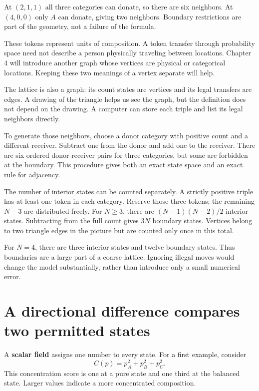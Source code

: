\documentclass[11pt,oneside,openany]{book}
\theoremstyle{definition}
\theoremstyle{remark}
\numberwithin{equation}{chapter}
\begin{document}
At \((2,1,1)\) all three categories can donate, so there are six neighbors. At \((4,0,0)\) only \(A\) can donate, giving two neighbors. Boundary restrictions are part of the geometry, not a failure of the formula.

These tokens represent units of composition. A token transfer through probability space need not describe a person physically traveling between locations. Chapter 4 will introduce another graph whose vertices are physical or categorical locations. Keeping these two meanings of a vertex separate will help.

The lattice is also a graph: its count states are vertices and its legal transfers are edges. A drawing of the triangle helps us see the graph, but the definition does not depend on the drawing. A computer can store each triple and list its legal neighbors directly.

To generate those neighbors, choose a donor category with positive count and a different receiver. Subtract one from the donor and add one to the receiver. There are six ordered donor-receiver pairs for three categories, but some are forbidden at the boundary. This procedure gives both an exact state space and an exact rule for adjacency.

The number of interior states can be counted separately. A strictly positive triple has at least one token in each category. Reserve those three tokens; the remaining \(N-3\) are distributed freely. For \(N\geq3\), there are \((N-1)(N-2)/2\) interior states. Subtracting from the full count gives \(3N\) boundary states. Vertices belong to two triangle edges in the picture but are counted only once in this total.

For \(N=4\), there are three interior states and twelve boundary states. Thus boundaries are a large part of a coarse lattice. Ignoring illegal moves would change the model substantially, rather than introduce only a small numerical error.

\section{A directional difference compares two permitted states}\label{ch03-a-directional-difference-compares-two-permitted-states}

A \textbf{scalar field} assigns one number to every state. For a first example, consider \[C(p)=p_A^2+p_B^2+p_C^2.\] This concentration score is one at a pure state and one third at the balanced state. Larger values indicate a more concentrated composition.
\end{document}
